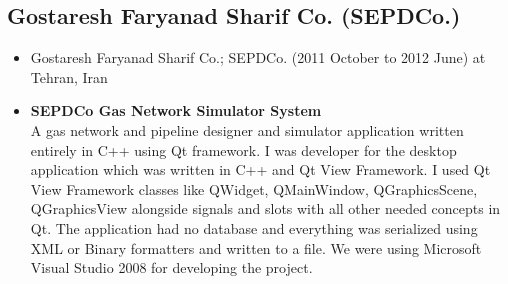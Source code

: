 \documentclass[12pt,a4paper]{article}
\begin{document}
	\subsection{Gostaresh Faryanad Sharif Co. (SEPDCo.)}
		\begin{itemize}
			\item Gostaresh Faryanad Sharif Co.; SEPDCo. (2011 October to 2012 June) at Tehran, Iran
			\item \small \textbf{SEPDCo Gas Network Simulator System} \\
			 A gas network and pipeline designer and simulator application written entirely in C++ using Qt framework. I was developer for the desktop application which was written in C++ and Qt View Framework. I used Qt View Framework classes like QWidget, QMainWindow, QGraphicsScene, QGraphicsView alongside signals and slots with all other needed concepts in Qt. The application had no database and everything was serialized using XML or Binary formatters and written to a file. We were using Microsoft Visual Studio 2008 for developing the project. \\
		\end{itemize}
		
\end{document}
